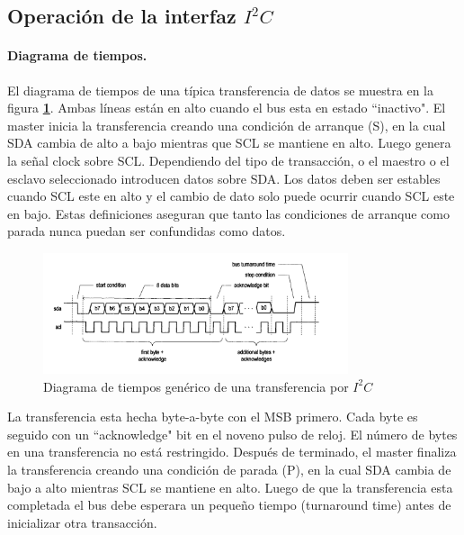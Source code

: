 \documentclass[11pt, a4paper]{article}
\begin{document}
		\subsection{Operación de la interfaz $I^{2}C$}
		\paragraph{Diagrama de tiempos.} El diagrama de tiempos de una típica transferencia de datos se muestra en la figura \textcolor{blue}{\textbf{\ref{fig:basic_timing}}}. Ambas líneas están en alto cuando el bus esta en estado ``inactivo". El master inicia la transferencia creando una condición de arranque (S), en la cual SDA cambia de alto a bajo mientras que SCL se mantiene en alto. Luego genera la señal clock sobre SCL. Dependiendo del tipo de transacción, o el maestro o el esclavo seleccionado introducen datos sobre SDA. Los datos deben ser estables cuando SCL este en alto y el cambio de dato solo puede ocurrir cuando SCL este en bajo. Estas definiciones aseguran que tanto las condiciones de arranque como parada nunca puedan ser confundidas como datos.
			
		\begin{figure}[H]
			\centering
			\includegraphics[width=0.8\textwidth]{Imagenes/basic_timing.png}
			\caption{Diagrama de tiempos genérico de una transferencia por $I^{2}C$}
			\label{fig:basic_timing}
		\end{figure} 

			La transferencia esta hecha byte-a-byte con el MSB primero. Cada byte es seguido con un ``acknowledge" bit en el noveno pulso de reloj. El número de bytes en una transferencia no está restringido. Después de terminado, el master finaliza la transferencia creando una condición de parada (P), en la cual SDA cambia de bajo a alto mientras SCL se mantiene en alto. Luego de que la transferencia esta completada el bus debe esperara un pequeño tiempo (turnaround time) antes de inicializar otra transacción.
		
\end{document}
